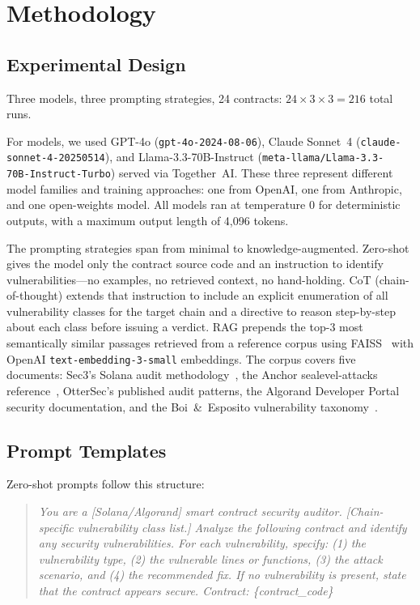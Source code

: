 \documentclass[journal]{IEEEtran}
\begin{document}
\section{Methodology}
\label{sec:methodology}

\subsection{Experimental Design}

Three models, three prompting strategies, 24 contracts: $24 \times 3 \times 3
= 216$ total runs.

For models, we used GPT-4o (\texttt{gpt-4o-2024-08-06}), Claude Sonnet~4
(\texttt{claude-sonnet-4-20250514}), and Llama-3.3-70B-Instruct
(\texttt{meta-llama/Llama-3.3-\\70B-Instruct-Turbo}) served via Together~AI.
These three represent different model families and training approaches:
one from OpenAI, one from Anthropic, and one open-weights model.
All models ran at temperature 0 for deterministic outputs, with a maximum
output length of 4{,}096 tokens.

The prompting strategies span from minimal to knowledge-augmented.
Zero-shot gives the model only the contract source code and an instruction
to identify vulnerabilities---no examples, no retrieved context, no
hand-holding.
CoT (chain-of-thought) extends that instruction to include an explicit
enumeration of all vulnerability classes for the target chain and a directive
to reason step-by-step about each class before issuing a verdict.
RAG prepends the top-3 most semantically similar passages retrieved from a
reference corpus using FAISS~\cite{liu2024llm4vuln} with OpenAI
\texttt{text-embedding-3-small} embeddings.
The corpus covers five documents: Sec3's Solana audit
methodology~\cite{sec32022audit}, the Anchor sealevel-attacks
reference~\cite{ferrante2022sealevel}, OtterSec's published audit patterns,
the Algorand Developer Portal security documentation, and the Boi~\&~Esposito
vulnerability taxonomy~\cite{boi2025prompt}.

\subsection{Prompt Templates}

Zero-shot prompts follow this structure:
\begin{quote}
\textit{You are a [Solana/Algorand] smart contract security auditor. [Chain-specific
vulnerability class list.] Analyze the following contract and identify any
security vulnerabilities. For each vulnerability, specify: (1) the vulnerability
type, (2) the vulnerable lines or functions, (3) the attack scenario, and
(4) the recommended fix. If no vulnerability is present, state that the contract
appears secure. Contract: \{contract\_code\}}
\end{quote}
\end{document}
